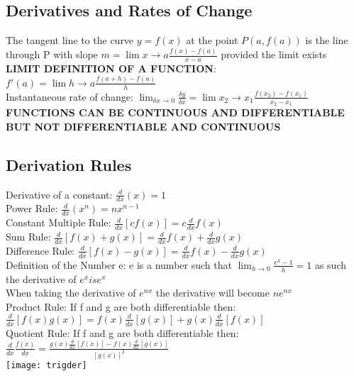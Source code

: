 \documentclass[10pt,a4paper]{article}
\begin{document}
\subsection{Derivatives and Rates of Change}
The tangent line to the curve $y=f(x)$ at the point $P(a,f(a))$ is the line through P with slope $m = \lim{x \rightarrow a}{\frac{f(x)-f(a)}{x-a}}$ provided the limit exists
\\\textbf{LIMIT DEFINITION OF A FUNCTION}: $f'(a) = \lim{h\rightarrow a}{\frac{f(a+h)-f(a)}{h}}$
\\Instantaneous rate of change: $\lim_{\delta x \rightarrow 0}{\frac{\delta y}{\delta x}} = \lim{x_{2}\rightarrow x_{1}}{\frac{f(x_{2})-f(x_{1})}{x_{2} - x_{1}}}$
\\\textbf{FUNCTIONS CAN BE CONTINUOUS AND DIFFERENTIABLE BUT NOT DIFFERENTIABLE AND CONTINUOUS}
\subsection{Derivation Rules}
Derivative of a constant: $\frac{d}{dx}(x) = 1$
\\Power Rule: $\frac{d}{dx}(x^{n}) = nx^{n-1}$
\\Constant Multiple Rule: $\frac{d}{dx}[cf(x)] = c\frac{d}{dx}f(x)$
\\Sum Rule: $\frac{d}{dx}[f(x)+g(x)] = \frac{d}{dx}f(x)+\frac{d}{dx}g(x)$
\\Difference Rule: $\frac{d}{dx}[f(x)-g(x)] = \frac{d}{dx}f(x)-\frac{d}{dx}g(x)$
\\Definition of the Number e: e is a number such that $ \lim_{h \rightarrow 0}{\frac{e^{h}-1}{h}}=1$ as such the derivative of $e^{x} is e^{x}$
\\When taking the derivative of $e^{nx}$ the derivative will become $ne^{nx}$
\\Product Rule: If f and g are both differentiable then: $\frac{d}{dx}[f(x)g(x)] = f(x)\frac{d}{dx}[g(x)]+g(x)\frac{d}{dx}[f(x)]$
\\Quotient Rule: If f and g are both differentiable then: $\frac{d}{dx}{\frac{f(x)}{dx}} = \frac{g(x)\frac{d}{dx}[f(x)]-f(x)\frac{d}{dx}[g(x)]}{[g(x)]^{2}}$
\\\texttt{[image: trigder]}
\end{document}
